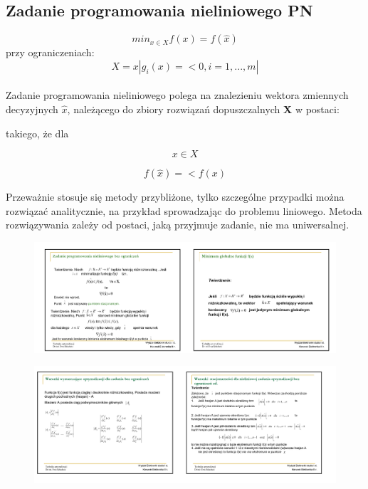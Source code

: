\documentclass[a4paper,twoside]{report}
\begin{document}
		
		
		
		
		
		
		\subsection{Zadanie programowania nieliniowego PN}
		
		$$min_{x \in X} f(x) = f(\hat{x})$$
		przy ograniczeniach:
		$$X={x|g_i(x)=<0, i=1,...,m|}$$ 
		\\
		Zadanie programowania nieliniowego polega na znalezieniu wektora zmiennych decyzyjnych $\hat{x}$, należącego do zbiory rozwiązań dopuszczalnych \textbf{X} w postaci: 
		
		takiego, że dla
		
		$$x \in X$$
		
		$$f(\hat{x})=<f(x)$$
		
		Przeważnie stosuje się metody przybliżone, tylko szczególne przypadki można rozwiązać analitycznie, na przykład sprowadzając do problemu liniowego. Metoda rozwiązywania zależy od postaci, jaką przyjmuje zadanie, nie ma uniwersalnej.
		
		\begin{figure}[H]
			\includegraphics[scale=0.3
			]{obrazy/optymalizacja/opt8.png}
		\end{figure} 
		
		\begin{figure}[H]
			\includegraphics[scale=0.3
			]{obrazy/optymalizacja/opt7.png}
		\end{figure} 
		
\end{document}
